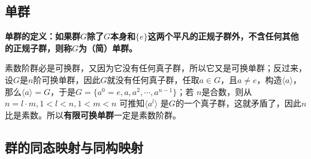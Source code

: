 \documentclass[12pt]{article}
\begin{document}
\subsection{单群}
\begin{mdframed}[
linecolor=black!40,outerlinewidth=1pt,roundcorner=.5em,innertopmargin=1ex,innerbottommargin=.5\baselineskip,innerrightmargin=1em,innerleftmargin=1em,backgroundcolor=gray!5,
]
\textbf{
单群的定义：如果群$G$除了$G$本身和$\{e\}$这两个平凡的正规子群外，不含任何其他的正规子群，则称$G$为（简）单群。
}
\end{mdframed}

素数阶群必是可换群，又因为它没有任何真子群，所以它又是可换单群；反过来，设$G$是$n$阶可换单群，因此$G$就没有任何真子群，任取$a \in G$，且$a \neq e$，构造$\langle a \rangle$，那么$\langle a \rangle = G$，于是$G = \{a^0=e, a, a^2, \cdots, a^{n-1}\}$；若 $n$是合数，则从$n = l \cdot m, 1 < l < n, 1 < m < n$ 可推知$\langle a^l \rangle$ 是$G$的一个真子群，这就矛盾了，因此$n$比是素数。所以\textbf{有限可换单群}一定是素数阶群。

\subsection{群的同态映射与同构映射}



\end{document}
